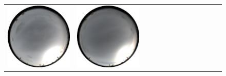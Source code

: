 \documentclass{report}
\begin{document}
\begin{figure}[!th]
\begin{tabular}{@{}rcccccccccccc@{}}
    \includegraphics[width=\customwidth]{./figures/database/20141108_150025.jpg} &
    \includegraphics[width=\customwidth]{./figures/database/20141108_153025.jpg} &

\end{tabular}
\end{figure}
\end{document}
